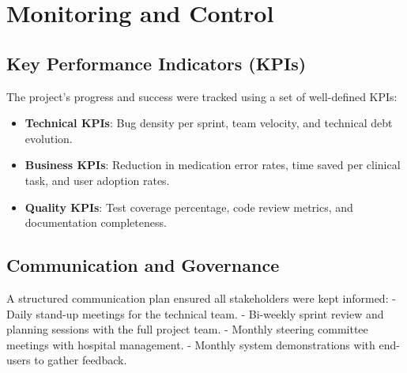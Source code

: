 \section{Monitoring and Control}

\subsection{Key Performance Indicators (KPIs)}

The project's progress and success were tracked using a set of well-defined KPIs:
\begin{itemize}
    \item \textbf{Technical KPIs}: Bug density per sprint, team velocity, and technical debt evolution.
    \item \textbf{Business KPIs}: Reduction in medication error rates, time saved per clinical task, and user adoption rates.
    \item \textbf{Quality KPIs}: Test coverage percentage, code review metrics, and documentation completeness.
\end{itemize}

\subsection{Communication and Governance}

A structured communication plan ensured all stakeholders were kept informed:
- Daily stand-up meetings for the technical team.
- Bi-weekly sprint review and planning sessions with the full project team.
- Monthly steering committee meetings with hospital management.
- Monthly system demonstrations with end-users to gather feedback. 